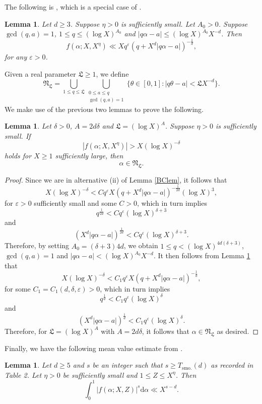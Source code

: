 \documentclass[reqno, 12pt, reqno]{amsart}
\numberwithin{equation}{section}
\newtheorem{lemma}[theorem]{Lemma}
\renewcommand{\leq}{\leqslant}
\renewcommand{\geq}{\geqslant}
\renewcommand{\=}{\equiv}
\begin{document}
The following is \cite[Lemma 4]{BC}, which is a special case of \cite[Lemma 8.5]{VW}.
\begin{lemma}\cite[Lemma 4]{BC}
\label{BClem'}
Let $d \geq 3$.
Suppose $\eta > 0$ is sufficiently small.
Let $A_0 > 0$. Suppose $\gcd(q,a) = 1$, $1 \leq q \leq (\log X)^{A_0}$ and $|q \alpha - a| \leq (\log X)^{A_0} X^{-d}$.
Then
$$
f(\alpha; X, X^{\eta}) \ll X q^{\varepsilon} (q + X^d |q\alpha - a|)^{- \frac{ 1 }{ d } },
$$
for any $\varepsilon > 0$.
\end{lemma}

Given a real parameter $\mathfrak{L} \geq 1$, we define
$$
\mathfrak{N}_\mathfrak{L} = \bigcup_{1 \leq q \leq  \mathfrak{L}} \bigcup_{ \substack{ 0 \leq a \leq q  \\  \gcd(q, a) = 1  }  }
\{ \theta \in [0,1]: \vert q \theta - a \vert <  \mathfrak{L} X^{ - d} \}.
$$
%
We make use of the previous two lemmas to prove the following.
\begin{lemma}
\label{min+}
Let $\delta > 0$,  $A = 2 d \delta$ and $\mathfrak{L} = (\log X)^A$.
Suppose $\eta > 0$ is sufficiently small.
If
$$
|f(\alpha; X, X^{\eta}) | >  X (\log X)^{- \delta}
$$
holds for $X \geq 1$ sufficiently large,
then
$$
\alpha \in \mathfrak{N}_\mathfrak{L}.
$$
\end{lemma}
\begin{proof}
Since we are in alternative (ii) of Lemma \ref{BClem}, it follows that
$$
X (\log X)^{- \delta} < C q^{\varepsilon} X ( q + X^d | q \alpha - a| )^{ - \frac{1}{2d}} (\log X)^3,
$$
for  $\varepsilon > 0$ sufficiently small and  some $C > 0$, which in turn implies
$$
q^{\frac{1}{2d}}   < C  q^{\varepsilon}  (\log X)^{\delta + 3}
$$
and
$$
(  X^d | q \alpha - a| )^{  \frac{1}{2d}}  < C q^{\varepsilon} (\log X)^{\delta + 3}.
$$
Therefore, by setting $A_0 =  (\delta + 3) 4 d$, we obtain
$1 \leq  q <  (\log X)^{ 4 d(\delta + 3) }$, $\gcd(q, a) = 1$ and $|q \alpha - a| < (\log X)^{A_0} X^{-d}$.
It then follows from Lemma \ref{BClem'} that
$$
X (\log X)^{- \delta} < C_1 q^{\varepsilon} X (q + X^d |q \alpha - a|)^{- \frac{1}{d}},
$$
for some $C_1 = C_1(d, \delta, \varepsilon) > 0$, which in turn implies
$$
q^{\frac{1}{d}}   < C_1  q^{\varepsilon}  (\log X)^{\delta}
$$
and
$$
(  X^d | q \alpha - a| )^{  \frac{1}{d}}  < C_1 q^{\varepsilon} (\log X)^{\delta}.
$$
Therefore, for $\mathfrak{L} = (\log X)^A$ with $A = 2 d \delta$, it follows that
$\alpha \in \mathfrak{N}_\mathfrak{L} $
as desired.
\end{proof}


Finally, we have the following mean value estimate from \cite{BruWoo}.
\begin{lemma}
\label{MVT1}
Let $d \geq 5$ and $s$ be an integer such that $s \geq T_{\text{smo.}}(d)$ as recorded in Table 2.
Let $\eta > 0$ be sufficiently small and $1 \leq Z \leq X^{\eta}$.
Then
$$
\int_0^1 |f(\alpha; X, Z)|^s \mathrm{d} \alpha \ll X^{s - d}.
$$
\end{lemma}
\end{document}
